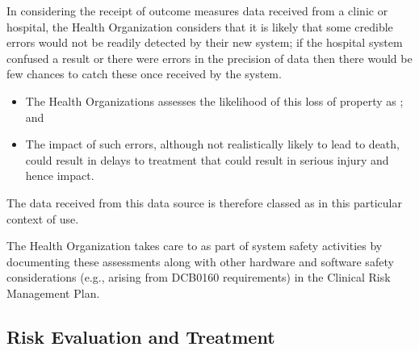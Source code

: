 In considering the receipt of outcome measures data received from a clinic or hospital, the Health Organization considers that it is likely that some credible errors would not be readily detected by their new system; if the hospital system confused a result or there were errors in the precision of data then there would be few chances to catch these once received by the system.
\begin{itemize}
  \item The Health Organizations assesses the likelihood of this loss of property as ; and
  \item The impact of such errors, although not realistically likely to lead to death, could result in delays to treatment that could result in serious injury and hence  impact.
\end{itemize}

The data received from this data source is therefore classed as  in this particular context of use.

The Health Organization takes care to  as part of system safety activities by documenting these assessments along with other hardware and software safety considerations (e.g., arising from
DCB0160
requirements) in the Clinical Risk Management Plan.

\subsection{Risk Evaluation and Treatment}

